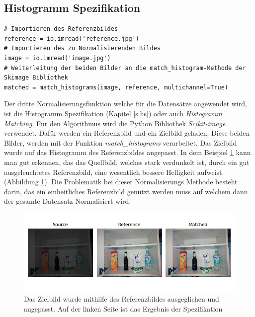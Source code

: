 \subsection{Histogramm Spezifikation}
\begin{lstlisting}
# Importieren des Referenzbildes
reference = io.imread('reference.jpg')
# Importieren des zu Normalisierenden Bildes
image = io.imread('image.jpg')
# Weiterleitung der beiden Bilder an die match_histogram-Methode der Skimage Bibliothek
matched = match_histograms(image, reference, multichannel=True)
\end{lstlisting}
Der dritte Normalisierungsfunktion welche für die Datensätze angewendet wird, ist die Histogramm Spezifikation (Kapitel \ref{s.hs}) oder auch \textit{Histogramm Matching}. Für den Algorithmus wird die Python Bibliothek \textit{Scikit-image} verwendet. Dafür werden ein Referenzbild und ein Zielbild geladen. Diese beiden Bilder, werden mit der Funktion \textit{match\_histograms} verarbeitet. Das Zielbild wurde auf das Histogramm des Referenzbildes angepasst. In dem Beispiel \ref{img:histogramspez} kann man gut erkennen, das das Quellbild, welches stark verdunkelt ist, durch ein gut ausgeleuchtetes Referenzbild, eine wesentlich bessere Helligkeit aufweist (Abbildung \ref{img:histogramspez}). Die Problematik bei dieser Normalisierungs Methode besteht darin, das ein einheitliches Referenzbild genutzt werden muss auf welchem dann der gesamte Datensatz Normalisiert wird.
\begin{figure}
	[h]
	\centering
	\includegraphics[scale=0.6]{Sources/HS_beispiel.png}
	\caption{Das Zielbild wurde mithilfe des Referenzbildes ausgeglichen und angepasst. Auf der linken Seite ist das Ergebnis der Spezifikation}
	\label{img:histogramspez}
\end{figure}